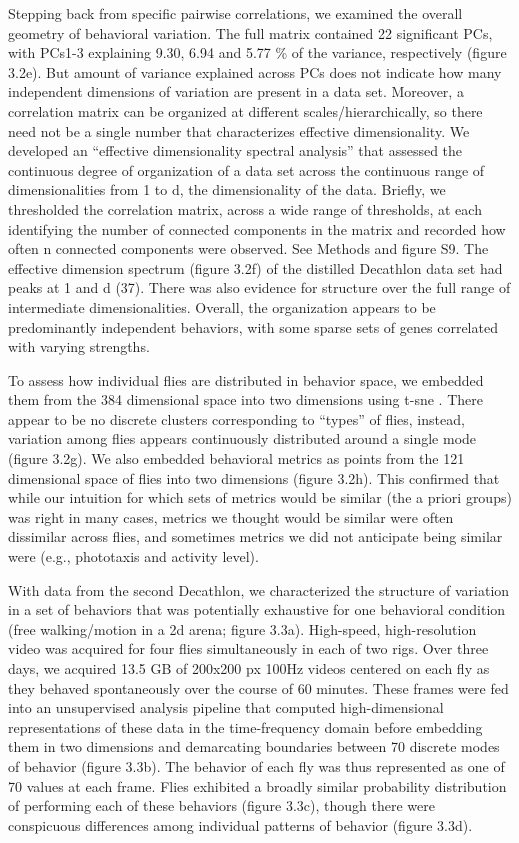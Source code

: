 \documentclass[12pt,letterpaper]{article}
\begin{document}
Stepping back from specific pairwise correlations, we examined the overall geometry of behavioral variation. The full matrix contained 22 significant PCs, with PCs1-3 explaining 9.30, 6.94 and 5.77 \% of the variance, respectively (figure 3.2e). But amount of variance explained across PCs does not indicate how many independent dimensions of variation are present in a data set. Moreover, a correlation matrix can be organized at different scales/hierarchically, so there need not be a single number that characterizes effective dimensionality. We developed an “effective dimensionality spectral analysis” that assessed the continuous degree of organization of a data set across the continuous range of dimensionalities from 1 to d, the dimensionality of the data. Briefly, we thresholded the correlation matrix, across a wide range of thresholds, at each identifying the number of connected components in the matrix and recorded how often n connected components were observed. See Methods and figure S9. The effective dimension spectrum (figure 3.2f) of the distilled Decathlon data set had peaks at 1 and d (37). There was also evidence for structure over the full range of intermediate dimensionalities. Overall, the organization appears to be predominantly independent behaviors, with some sparse sets of genes correlated with varying strengths. 

To assess how individual flies are distributed in behavior space, we embedded them from the 384 dimensional space into two dimensions using t-sne \cite{Maaten_Visualizing_2008}. There appear to be no discrete clusters corresponding to “types” of flies, instead, variation among flies appears continuously distributed around a single mode (figure 3.2g). We also embedded behavioral metrics as points from the 121 dimensional space of flies into two dimensions (figure 3.2h). This confirmed that while our intuition for which sets of metrics would be similar (the a priori groups) was right in many cases, metrics we thought would be similar were often dissimilar across flies, and sometimes metrics we did not anticipate being similar were (e.g., phototaxis and activity level). 

With data from the second Decathlon, we characterized the structure of variation in a set of behaviors that was potentially exhaustive for one behavioral condition (free walking/motion in a 2d arena; figure 3.3a). High-speed, high-resolution video was acquired for four flies simultaneously in each of two rigs. Over three days, we acquired 13.5 GB of 200x200 px 100Hz videos centered on each fly as they behaved spontaneously over the course of 60 minutes. These frames were fed into an unsupervised analysis pipeline \cite{berman_choi_bialek_shaevitz_2014} that computed high-dimensional representations of these data in the time-frequency domain before embedding them in two dimensions and demarcating boundaries between 70 discrete modes of behavior (figure 3.3b). The behavior of each fly was thus represented as one of 70 values at each frame. Flies exhibited a broadly similar probability distribution of performing each of these behaviors (figure 3.3c), though there were conspicuous differences among individual patterns of behavior (figure 3.3d).
\end{document}
